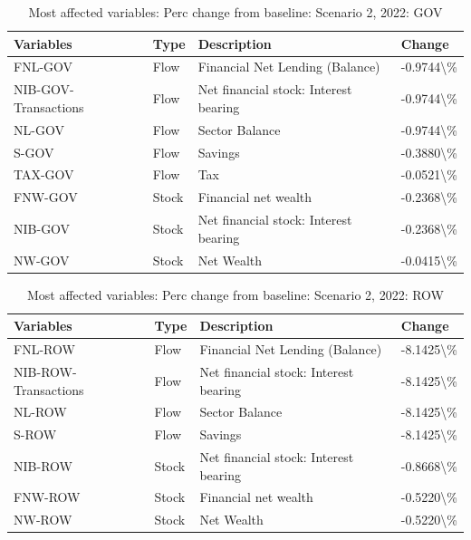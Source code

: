 \documentclass[
]{book}
\begin{document}
\begin{table}

\caption{\label{tab:most-affected-scenario-2-perc-GOV}Most affected variables: Perc change from baseline: Scenario 2, 2022: GOV}
\centering
\fontsize{10}{12}\selectfont
\begin{tabular}[t]{l|l|l|l}
\hline
Variables & Type & Description & Change\\
\hline
FNL-GOV & Flow & Financial Net Lending (Balance) & -0.9744\textbackslash{}\%\\
\hline
NIB-GOV-Transactions & Flow & Net financial stock: Interest bearing & -0.9744\textbackslash{}\%\\
\hline
NL-GOV & Flow & Sector Balance & -0.9744\textbackslash{}\%\\
\hline
S-GOV & Flow & Savings & -0.3880\textbackslash{}\%\\
\hline
TAX-GOV & Flow & Tax & -0.0521\textbackslash{}\%\\
\hline
FNW-GOV & Stock & Financial net wealth & -0.2368\textbackslash{}\%\\
\hline
NIB-GOV & Stock & Net financial stock: Interest bearing & -0.2368\textbackslash{}\%\\
\hline
NW-GOV & Stock & Net Wealth & -0.0415\textbackslash{}\%\\
\hline
\end{tabular}
\end{table}

\begin{table}

\caption{\label{tab:most-affected-scenario-2-perc-ROW}Most affected variables: Perc change from baseline: Scenario 2, 2022: ROW}
\centering
\fontsize{10}{12}\selectfont
\begin{tabular}[t]{l|l|l|l}
\hline
Variables & Type & Description & Change\\
\hline
FNL-ROW & Flow & Financial Net Lending (Balance) & -8.1425\textbackslash{}\%\\
\hline
NIB-ROW-Transactions & Flow & Net financial stock: Interest bearing & -8.1425\textbackslash{}\%\\
\hline
NL-ROW & Flow & Sector Balance & -8.1425\textbackslash{}\%\\
\hline
S-ROW & Flow & Savings & -8.1425\textbackslash{}\%\\
\hline
NIB-ROW & Stock & Net financial stock: Interest bearing & -0.8668\textbackslash{}\%\\
\hline
FNW-ROW & Stock & Financial net wealth & -0.5220\textbackslash{}\%\\
\hline
NW-ROW & Stock & Net Wealth & -0.5220\textbackslash{}\%\\
\hline
\end{tabular}
\end{table}
\end{document}
